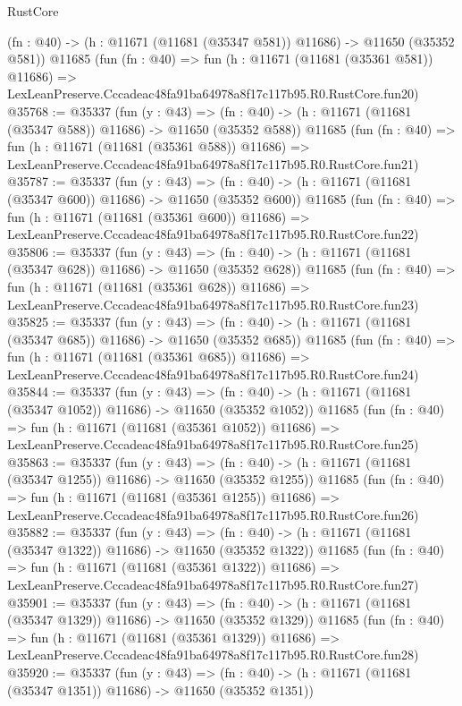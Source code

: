 \begin{lexlean}{RustCore}
\begin{coremodule}
    (fn : @40) -> (h : @11671 (@11681 (@35347 @581)) @11686) -> @11650 (@35352 @581))
    @11685
    (fun (fn : @40) =>
    fun (h : @11671 (@11681 (@35361 @581)) @11686) =>
    LexLeanPreserve.Cccadeac48fa91ba64978a8f17c117b95.R0.RustCore.fun20)
@35768 := @35337
    (fun (y : @43) =>
    (fn : @40) -> (h : @11671 (@11681 (@35347 @588)) @11686) -> @11650 (@35352 @588))
    @11685
    (fun (fn : @40) =>
    fun (h : @11671 (@11681 (@35361 @588)) @11686) =>
    LexLeanPreserve.Cccadeac48fa91ba64978a8f17c117b95.R0.RustCore.fun21)
@35787 := @35337
    (fun (y : @43) =>
    (fn : @40) -> (h : @11671 (@11681 (@35347 @600)) @11686) -> @11650 (@35352 @600))
    @11685
    (fun (fn : @40) =>
    fun (h : @11671 (@11681 (@35361 @600)) @11686) =>
    LexLeanPreserve.Cccadeac48fa91ba64978a8f17c117b95.R0.RustCore.fun22)
@35806 := @35337
    (fun (y : @43) =>
    (fn : @40) -> (h : @11671 (@11681 (@35347 @628)) @11686) -> @11650 (@35352 @628))
    @11685
    (fun (fn : @40) =>
    fun (h : @11671 (@11681 (@35361 @628)) @11686) =>
    LexLeanPreserve.Cccadeac48fa91ba64978a8f17c117b95.R0.RustCore.fun23)
@35825 := @35337
    (fun (y : @43) =>
    (fn : @40) -> (h : @11671 (@11681 (@35347 @685)) @11686) -> @11650 (@35352 @685))
    @11685
    (fun (fn : @40) =>
    fun (h : @11671 (@11681 (@35361 @685)) @11686) =>
    LexLeanPreserve.Cccadeac48fa91ba64978a8f17c117b95.R0.RustCore.fun24)
@35844 := @35337
    (fun (y : @43) =>
    (fn : @40) -> (h : @11671 (@11681 (@35347 @1052)) @11686) -> @11650 (@35352 @1052))
    @11685
    (fun (fn : @40) =>
    fun (h : @11671 (@11681 (@35361 @1052)) @11686) =>
    LexLeanPreserve.Cccadeac48fa91ba64978a8f17c117b95.R0.RustCore.fun25)
@35863 := @35337
    (fun (y : @43) =>
    (fn : @40) -> (h : @11671 (@11681 (@35347 @1255)) @11686) -> @11650 (@35352 @1255))
    @11685
    (fun (fn : @40) =>
    fun (h : @11671 (@11681 (@35361 @1255)) @11686) =>
    LexLeanPreserve.Cccadeac48fa91ba64978a8f17c117b95.R0.RustCore.fun26)
@35882 := @35337
    (fun (y : @43) =>
    (fn : @40) -> (h : @11671 (@11681 (@35347 @1322)) @11686) -> @11650 (@35352 @1322))
    @11685
    (fun (fn : @40) =>
    fun (h : @11671 (@11681 (@35361 @1322)) @11686) =>
    LexLeanPreserve.Cccadeac48fa91ba64978a8f17c117b95.R0.RustCore.fun27)
@35901 := @35337
    (fun (y : @43) =>
    (fn : @40) -> (h : @11671 (@11681 (@35347 @1329)) @11686) -> @11650 (@35352 @1329))
    @11685
    (fun (fn : @40) =>
    fun (h : @11671 (@11681 (@35361 @1329)) @11686) =>
    LexLeanPreserve.Cccadeac48fa91ba64978a8f17c117b95.R0.RustCore.fun28)
@35920 := @35337
    (fun (y : @43) =>
    (fn : @40) -> (h : @11671 (@11681 (@35347 @1351)) @11686) -> @11650 (@35352 @1351))

\end{coremodule}
\end{lexlean}
